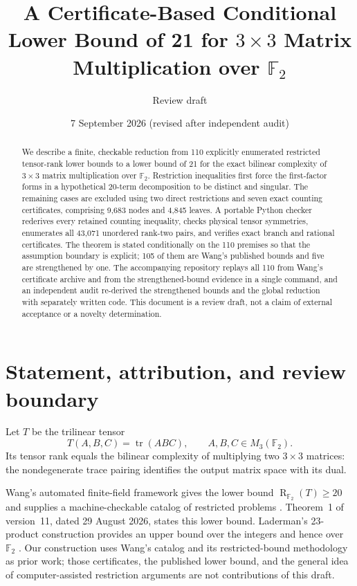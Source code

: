 \documentclass[11pt]{article}
\title{A Certificate-Based Conditional Lower Bound of 21\newline
for $3\times3$ Matrix Multiplication over $\mathbb F_2$}
\author{Review draft}
\date{7 September 2026 (revised after independent audit)}
\newcommand{\F}{\mathbb F_2}
\newcommand{\V}{M_3(\F)}
\newcommand{\R}{\operatorname{R}_{\F}}
\newcommand{\tr}{\operatorname{tr}}
\theoremstyle{definition}
\begin{document}
\maketitle
\begin{abstract}
We describe a finite, checkable reduction from 110 explicitly enumerated restricted tensor-rank lower bounds to a lower bound of 21 for the exact bilinear complexity of $3\times3$ matrix multiplication over $\mathbb F_2$. Restriction inequalities first force the first-factor forms in a hypothetical 20-term decomposition to be distinct and singular. The remaining cases are excluded using two direct restrictions and seven exact counting certificates, comprising 9,683 nodes and 4,845 leaves. A portable Python checker rederives every retained counting inequality, checks physical tensor symmetries, enumerates all 43,071 unordered rank-two pairs, and verifies exact branch and rational certificates. The theorem is stated conditionally on the 110 premises so that the assumption boundary is explicit; 105 of them are Wang's published bounds and five are strengthened by one. The accompanying repository replays all 110 from Wang's certificate archive and from the strengthened-bound evidence in a single command, and an independent audit re-derived the strengthened bounds and the global reduction with separately written code. This document is a review draft, not a claim of external acceptance or a novelty determination.
\end{abstract}

\section{Statement, attribution, and review boundary}
Let $T$ be the trilinear tensor
\[
 T(A,B,C)=\tr(ABC),\qquad A,B,C\in\V.
\]
Its tensor rank equals the bilinear complexity of multiplying two $3\times3$ matrices: the nondegenerate trace pairing identifies the output matrix space with its dual.

Wang's automated finite-field framework gives the lower bound
$\R(T)\geq20$ and supplies a machine-checkable catalog of restricted problems \cite{wang2026,wangrepo}. Theorem~1 of version~11, dated 29 August 2026, states this lower bound. Laderman's 23-product construction provides an upper bound over the integers and hence over $\F$ \cite{laderman1976}. Our construction uses Wang's catalog and its restricted-bound methodology as prior work; those certificates, the published lower bound, and the general idea of computer-assisted restriction arguments are not contributions of this draft.
\end{document}
